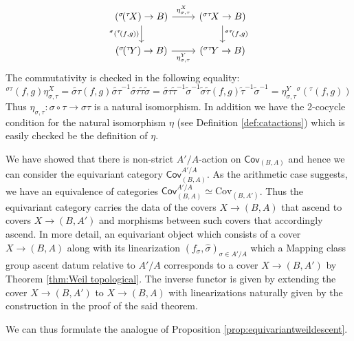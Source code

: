\documentclass[10pt]{amsart}
\theoremstyle{definition}
\begin{document}
\begin{equation*}
    \begin{tikzcd}
        ({^\sigma \! ({^\tau \! X})} \to B) \arrow[d, "{^\sigma ({^\tau \! (f,g)})}"'] \arrow[r, "\eta^X_{\sigma, \tau}"] & ({^{\sigma\tau} \! X} \to B) \arrow[d, "{^{\sigma\tau} \! (f,g)}"]\\
        ({^\sigma \! ({^\tau \! Y})} \to B) \arrow[r, "\eta^Y_{\sigma, \tau}"'] & ({^{\sigma\tau} \! Y} \to B)
    \end{tikzcd}
\end{equation*}
The commutativity is checked in the following equality:
\[
{^{\sigma\tau} \! (f,g)} \eta^X_{\sigma,\tau } = \widetilde{\sigma \tau} (f,g) \widetilde{\sigma \tau}^{-1} \widetilde{\sigma \tau} \tilde{\tau} \tilde{\sigma} = \widetilde{\sigma \tau} \tilde{\tau}^{-1} \tilde{\sigma}^{-1} \tilde{\sigma} \tilde{\tau} (f,g) \tilde{\tau}^{-1} \tilde {\sigma}^{-1} = \eta^Y_{\sigma,\tau}{^\sigma ({^\tau \! (f,g)})}
\]
Thus $\eta_{\sigma,\tau} \colon \sigma \circ \tau \to \sigma\tau$ is a natural isomorphism. In addition we have the 2-cocycle condition for the natural isomorphism $\eta$ (see Definition \ref{def:catactions}) which is easily checked be the definition of $\eta$.


We have showed that there is non-strict $A'/A$-action on $\mathsf{Cov}_{(B,A)}$ and hence we can consider the equivariant category $\mathsf{Cov}_{(B,A)}^{A'/A}$.
As the arithmetic case suggests, we have an equivalence of categories $\mathsf{Cov}_{(B,A)}^{A'/A} \simeq \mathrm{Cov}_{(B,A')}$. Thus the equivariant category carries the data of the covers $X \to (B,A)$ that ascend to covers $X \to (B,A')$ and morphisms between such covers that accordingly ascend. In more detail, an equivariant object which consists of a cover $X \to (B,A)$ along with its linearization $(f_\sigma, \hat{\sigma})_{\sigma \in A'/A}$ which a Mapping class group ascent datum relative to $A'/A$ corresponds to a cover $X \to (B,A')$ by Theorem \ref{thm:Weil topological}. The inverse functor is given by extending the cover $X \to(B,A')$ to $X \to (B,A)$ with linearizations naturally given by the construction in the proof of the said theorem.

We can thus formulate the analogue of Proposition \ref{prop:equivariantweildescent}.
\end{document}
